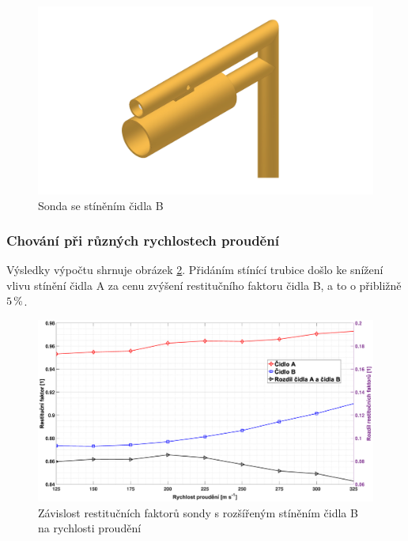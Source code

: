         \begin{figure}[ht!]
            \centering
            \includegraphics[width=\textwidth]{400_SIMULACE_KONSTRUKCNICH_UPRAV/Vykresy_rendery/Sonda_s_rozsirenym_stinenim_B.png}
            \caption{Sonda se stíněním čidla B}
            \label{fig:sonda-s-rozsirenym-stinenim-B}
        \end{figure}
        
        \subsubsection{Chování při různých rychlostech proudění}
            Výsledky výpočtu shrnuje obrázek \ref{fig:sonda-s-rosirenym-stinenim-rychlosti}. Přidáním stínící trubice došlo ke snížení vlivu stínění čidla A za cenu zvýšení restitučního faktoru čidla B, a to o přibližně $5 \, \%$.
            
            \begin{figure}[ht!]
                \centering
                \includegraphics*[width=\textwidth, trim={5.9cm 1.0cm 2.7cm 2.0cm}]{400_SIMULACE_KONSTRUKCNICH_UPRAV/Grafy/03_rychlosti.eps}
                \caption{Závislost restitučních faktorů sondy s rozšířeným stíněním čidla B na rychlosti proudění}
                \label{fig:sonda-s-rosirenym-stinenim-rychlosti}
            \end{figure}

